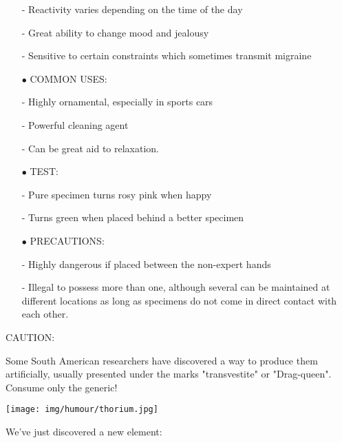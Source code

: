 \begin{itemize}
- Reactivity varies depending on the time of the day

- Great ability to change mood and jealousy

- Sensitive to certain constraints which sometimes transmit migraine

	\item[$\bullet$] COMMON USES: 

- Highly ornamental, especially in sports cars

- Powerful cleaning agent

- Can be great aid to relaxation.

	\item[$\bullet$] TEST: 

- Pure specimen turns rosy pink when happy

- Turns green when placed behind a better specimen

	\item[$\bullet$] PRECAUTIONS:

- Highly dangerous if placed between the non-expert hands

- Illegal to possess more than one, although several can be maintained at different locations as long as specimens do not come in direct contact with each other.

\end{itemize}

CAUTION: 

Some South American researchers have discovered a way to produce them artificially, usually presented under the marks "transvestite" or "Drag-queen". Consume only the generic!
	\begin{center}\underline{\hspace{5 cm}}\end{center}

	\begin{center}
	\texttt{[image: img/humour/thorium.jpg]}
	\end{center}
	
	\begin{center}\underline{\hspace{5 cm}}\end{center}

We've just discovered a new element:

